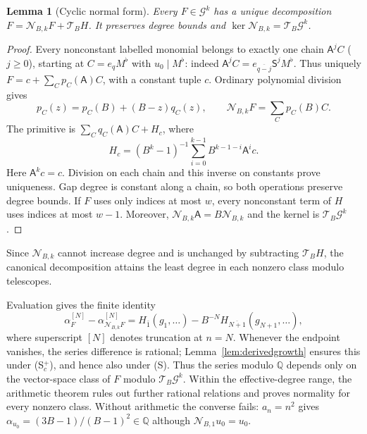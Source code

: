 \documentclass[11pt,a4paper]{article}
\newtheorem{lemma}[theorem]{Lemma}
\newcommand{\Q}{\mathbb Q}
\begin{document}
\begin{lemma}[Cyclic normal form]\label{lem:localnormalform}
Every $F\in\mathcal G^k$ has a unique decomposition
$F=\mathcal N_{B,k}F+\mathcal T_BH$.
It preserves degree bounds and
$\ker\mathcal N_{B,k}=\mathcal T_B\mathcal G^k$.
\end{lemma}
\begin{proof}
Every nonconstant labelled monomial belongs to exactly one chain
$\mathsf A^jC$ ($j\ge0$), starting at $C=e_qM^\flat$ with
$u_0\mid M^\flat$: indeed
$\mathsf A^jC=e_{\overline{q-j}}\mathsf S^jM^\flat$.
Thus uniquely $F=c+\sum_C p_C(\mathsf A)C$, with a constant tuple $c$.
Ordinary polynomial division gives
\[
 p_C(z)=p_C(B)+(B-z)q_C(z),\qquad
 \mathcal N_{B,k}F=\sum_Cp_C(B)C.
\]
The primitive is $\sum_Cq_C(\mathsf A)C+H_c$, where
\[
 H_c=(B^k-1)^{-1}\sum_{i=0}^{k-1}B^{k-1-i}\mathsf A^ic.
\]
Here $\mathsf A^kc=c$. Division on each chain and this inverse on
constants prove uniqueness. Gap degree is constant along a chain,
so both operations preserve degree bounds. If $F$ uses only indices
at most $w$, every nonconstant term of $H$ uses indices at most $w-1$.
Moreover,
$\mathcal N_{B,k}\mathsf A=B\mathcal N_{B,k}$ and the kernel is
$\mathcal T_B\mathcal G^k$.
\end{proof}
Since $\mathcal N_{B,k}$ cannot increase degree and is unchanged by
subtracting $\mathcal T_BH$, the canonical decomposition attains the
least degree in each nonzero class modulo telescopes.

Evaluation gives the finite identity
\begin{equation}\label{eq:localboundary}
 \alpha_F^{[N]}-\alpha_{\mathcal N_{B,k}F}^{[N]}
 =H_{\bar1}(g_1,\ldots)-B^{-N}H_{\overline{N+1}}(g_{N+1},\ldots),
\end{equation}
where superscript $[N]$ denotes truncation at $n=N$.
Whenever the endpoint vanishes, the series difference is rational;
Lemma~\ref{lem:derivedgrowth} ensures this under (S$^+_c$),
and hence also under (S).
Thus the series modulo $\Q$ depends only on the vector-space class
of $F$ modulo $\mathcal T_B\mathcal G^k$.
Within the effective-degree range, the arithmetic theorem rules out
further rational relations and proves normality for every nonzero class.
Without arithmetic the converse fails: $a_n=n^2$ gives
$\alpha_{u_0}=(3B-1)/(B-1)^2\in\Q$ although
$\mathcal N_{B,1}u_0=u_0$.
\end{document}
